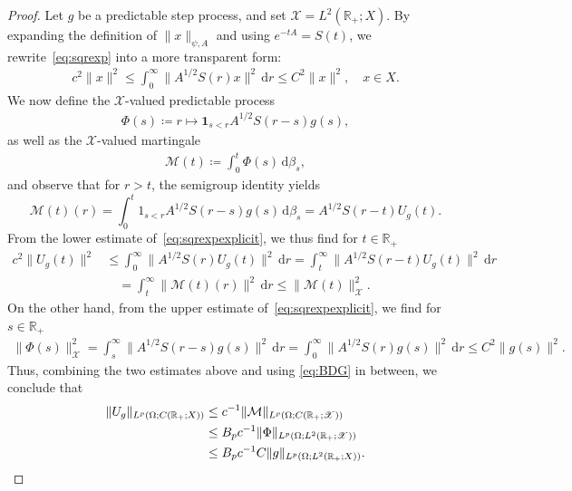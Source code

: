 \documentclass[11pt]{amsart}
\theoremstyle{definition}
\theoremstyle{remark}
\numberwithin{equation}{section}
\newcommand{\R}{\mathbb R}
\newcommand{\1}{\mathbf 1}
\newcommand{\norm}[1]{\lVert #1\rVert}
\newcommand{\dd}{\,\mathrm d}
\newcommand{\one}{\1}
\begin{document}
\begin{proof}
    Let $g$ be a predictable step process, and set $\mathscr{X} = L^2(\R_+;X)$.
    By expanding the definition of $\norm{x}_{\psi,A}$ and using $e^{-tA} = S(t)$, we rewrite~\eqref{eq:sqrexp} into a more transparent form:
    \begin{align}
        \label{eq:sqrexpexplicit}
        c^2 \norm{x}^2 \leq \int_0^{\infty}\norm{A^{1/2}S(r)x}^2 \dd r \leq C^2 \norm{x}^2, \quad x \in X.
    \end{align}
    We now define the $\mathscr{X}$-valued predictable process
    \begin{align*}
        \Phi(s) \coloneq r \mapsto \one_{s < r}A^{1/2}S(r-s)g(s),
    \end{align*}
    as well as the $\mathscr{X}$-valued martingale
    \begin{align*}
        \mathcal{M}(t) \coloneq \int_0^t \Phi(s)\dd \beta_s,
    \end{align*}
    and observe that for $r > t$, the semigroup identity yields
    \begin{equation*}
        \mathcal{M}(t)(r) = \int_0^t 1_{s < r}A^{1/2}S(r-s)g(s) \dd \beta_s = A^{1/2}S(r-t)U_g(t).
    \end{equation*}
    From the lower estimate of~\eqref{eq:sqrexpexplicit}, we thus find for $t \in \R_+$
    \begin{align*}
        c^2 \norm{U_g(t)}^2 &\leq \int_0^{\infty} \norm{A^{1/2} S(r)U_g(t)}^2 \dd r
        = \int_t^{\infty} \norm{A^{1/2} S(r-t)U_g(t)}^2 \dd r 
        \\&\quad= \int_t^{\infty}\norm{\mathcal{M}(t)(r)}^2 \dd r \leq \norm{\mathcal{M}(t)}_{\mathscr{X}}^2.
    \end{align*}
    On the other hand, from the upper estimate of~\eqref{eq:sqrexpexplicit}, we find for $s \in \R_+$
    \begin{align*}
        \norm{\Phi(s)}_{\mathscr{X}}^2 = \int_s^{\infty}\norm{ A^{1/2}S(r-s)g(s)}^2 \dd r
        = \int_0^{\infty}\norm{ A^{1/2}S(r)g(s)}^2 \dd r \leq C^2 \norm{g(s)}^2.
    \end{align*}
    Thus, combining the two estimates above and using \eqref{eq:BDG} in between, we conclude that
    \begin{align*}
        \norm{U_g}_{L^p(\Omega;C(\R_+;X))} 
        &\leq c^{-1}
        \norm{\mathcal{M}}_{L^p(\Omega;C(\R_+;\mathscr{X}))} 
        \\ & \leq B_p c^{-1}
        \norm{\Phi}_{L^p(\Omega;L^2(\R_+;\mathscr{X}))} 
        \\ & \leq B_p c^{-1}C\norm{g}_{L^p(\Omega;L^2(\R_+;X))}. \qedhere
    \end{align*}
    
\end{proof}
\end{document}
